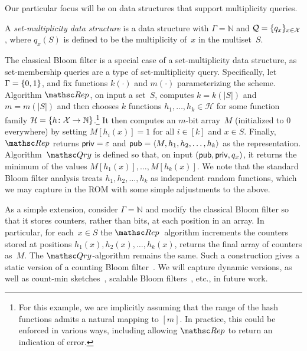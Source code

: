  Our
particular focus will be on data structures that support
multiplicity queries.

\begin{definition} \rm
A \emph{set-multiplicity data structure} is a data structure with
$\Gamma=\mathbb{N}$ and ${\cal Q}=\{q_x\}_{x \in {\cal X}}$, where
$q_x(S)$ is defined to be the multiplicity of~$x$ in the
multiset~$S$. \hfill\dqed
\end{definition}

The classical Bloom filter is a special case of a set-multiplicity
data structure, as set-membership queries are a type of
set-multiplicity query.  Specifically,
let $\Gamma=\{0,1\}$, and fix functions $k(\cdot)$ and $m(\cdot)$
parameterizing the scheme.  Algorithm $\Rep$, on input a set~$S$,
computes $k=k(|S|)$ and $m=m(|S|)$ and then chooses $k$ functions
$h_1, \ldots, h_k \in \mathcal{H}$ for some function family
$\mathcal{H}=\{h \colon {\cal X} \to \mathbb{N}\}$.\footnote{For this
  example, we are implicitly assuming that the range of the hash
  functions admits a natural mapping to $[m]$.  In practice, this
  could be enforced in various ways, including allowing $\Rep$ to
  return an indication of error. }
It then computes an $m$-bit
array~$M$ (initialized to 0 everywhere) by setting $M[h_i(x)]=1$ for
all $i\in [k]$ and $x \in S$.  Finally, $\Rep$ returns
${\sf priv}=\varepsilon$ and ${\sf pub} = \langle
M,h_1,h_2,\ldots,h_k\rangle$ as the representation.
%
Algorithm~$\Qry$ is defined so that, on input
$({\sf pub},{\sf priv},q_x)$, it returns the minimum of the values
$M[h_1(x)],\ldots,M[h_k(x)]$.  We note that the standard Bloom filter
analysis treats $h_1,h_2,\ldots,h_k$ as independent random functions,
which we may capture in the ROM with some simple adjustments to the above.

As a simple extension, consider $\Gamma=\mathbb{N}$ and modify the
classical Bloom filter so that it stores counters, rather than bits, at
each position in an array.  In particular, for each~$x \in S$ the
$\Rep$~algorithm increments the counters stored at positions
$h_1(x), h_2(x), \ldots, h_k(x)$, returns the final array of
counters as~$M$.  The $\Qry$-algorithm remains the same. Such a
construction gives a static version of a counting Bloom
filter~\cite{fan2000summary}.  We will capture dynamic versions, as well as
count-min sketches~\cite{cormode2005improved}, scalable Bloom filters~\cite{almeida2007scalable},
etc., in future work.

